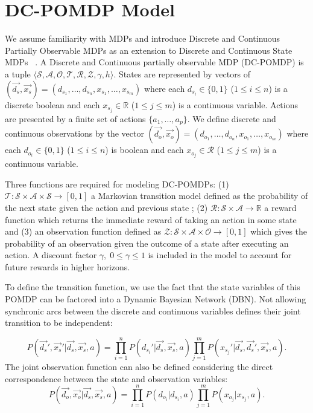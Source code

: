 \documentclass{article} %
\begin{document}
\section{DC-POMDP Model} 
We assume familiarity with MDPs and introduce Discrete and Continuous Partially Observable MDPs as an extension to Discrete and Continuous State MDPs ~\cite{sanner_uai11}. A Discrete and Continuous partially observable MDP (DC-POMDP) is a tuple $\langle
\mathcal{S},\mathcal{A},\mathcal{O},\mathcal{T},\mathcal{R},\mathcal{Z},\gamma,h \rangle$. 
States are represented by vectors of $(\vec{d_s},\vec{x_s}) = ( d_{s_1},\ldots,d_{s_n},x_{s_1},\ldots,x_{s_m} )$ where each $d_{s_i} \in \{ 0,1 \}$ ($1 \leq i \leq n$) is a discrete boolean and each $x_{s_j} \in  \mathbb{R}$ ($1 \leq j \leq m$) is a continuous variable. Actions are presented by a finite set of actions $\{ a_1, \ldots, a_p \}$. We define discrete and continuous observations by the vector $(\vec{d_o},\vec{x_o}) = ( d_{o_1},\ldots,d_{o_n},x_{o_1},\ldots,x_{o_m} )$ where each $d_{o_i} \in \{ 0,1 \}$ ($1 \leq i \leq n$) is boolean and each $x_{o_j} \in \mathcal{R}$ ($1 \leq j \leq m$) is a continuous variable. 

Three functions are required for modeling DC-POMDPs: (1) $\mathcal{T}: \mathcal{S} \times \mathcal{A} \times \mathcal{S} \rightarrow  [ 0, 1 ]$ a Markovian transition model defined as the probability of the next state given the action and previous state%
; (2)  $\mathcal{R}:\mathcal{S}\times\mathcal{A} \rightarrow \mathbb{R}$ a reward function which returns the immediate reward of taking an action in some state and (3) an observation function defined as $\mathcal{Z} : \mathcal{S} \times \mathcal{A} \times \mathcal{O} \rightarrow [ 0, 1 ]$  which gives the probability of an observation given the outcome of a state after executing an action.  A discount factor $\gamma, \; 0 \leq \gamma \leq 1$ is included in the model to account for future rewards in higher horizons.

To define the transition function, we use the fact that the state variables of this POMDP can be factored into a Dynamic Bayesian Network (DBN). Not allowing synchronic arcs between the discrete and continuous variables defines their joint transition to be independent: 

{\footnotesize
\begin{equation}
P(\vec{d_s}',\vec{x_s}'|\vec{d_s},\vec{x_s},a) = 
\prod_{i=1}^n P(d_{s_i}'|\vec{d_s},\vec{x_s},a) \prod_{j=1}^m P(x_{s_j}'|\vec{d_s},\vec{d_s}',\vec{x_s},a). \nonumber 
\end{equation}}
The joint observation function can also be defined considering the direct correspondence between the state and observation variables:
{\footnotesize
\begin{equation}
P(\vec{d_o},\vec{x_o}|\vec{d_s},\vec{x_s},a) = 
\prod_{i=1}^n P(d_{o_i}|d_{s_i},a) \prod_{j=1}^m P(x_{o_j}|x_{s_j},a). \nonumber 
\end{equation}}
\end{document}
